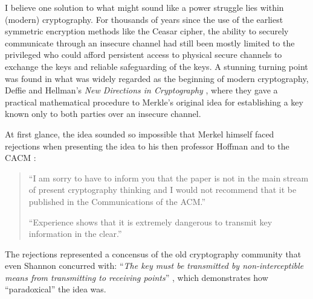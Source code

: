 \documentclass[10pt]{article}
\begin{document}
I believe one solution to what might sound like a power struggle lies within
(modern) cryptography. For thousands of years since the use of the earliest
symmetric encryption methods like the Ceasar cipher, the ability to securely
communicate through an insecure channel had still been mostly limited to the
privileged who could afford persistent access to physical secure channels to
exchange the keys and reliable safeguarding of the keys.  A stunning turning
point was found in what was widely regarded as the beginning of modern
cryptography, Deffie and Hellman's \emph{New Directions in Cryptography}
\cite{new.directions.crypto}, where they gave a practical mathematical
procedure to Merkle's original idea for establishing a key known only to both
parties over an insecure channel.

At first glance, the idea sounded so impossible that Merkel himself faced 
rejections when presenting the idea to his then professor Hoffman and to the
CACM \cite{merkle.rejection}:
\begin{quotation}
	``I am sorry to have to inform you that the paper is not in the main stream
	of present cryptography thinking and I would not recommend that it be
	published in the Communications of the ACM.''

	``Experience shows that it is extremely dangerous to transmit key
	information in the clear.''\cite{merkle.rejection}
\end{quotation}
The rejections represented a concensus of the old cryptography community that
even Shannon concurred with: ``\emph{The key must be transmitted by
non-interceptible means from transmitting to receiving points}''
\cite[p.~670]{shannon.theory.secrecy}, which demonstrates how ``paradoxical''
the idea was.
\end{document}

